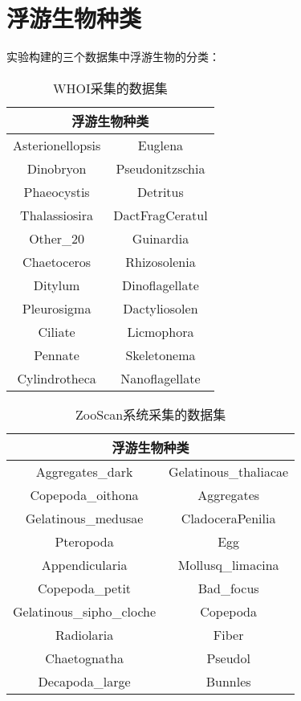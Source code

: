 \chapter{浮游生物种类}
\label{fulu}

实验构建的三个数据集中浮游生物的分类：

\begin{table}[ht]
\small
  \centering
  \caption{WHOI采集的数据集}
  \begin{tabular}[c]{cc}
    \toprule
    \multicolumn{2}{c}{浮游生物种类}\\
    \midrule
    Asterionellopsis & Euglena\\
    Dinobryon & Pseudonitzschia\\
    Phaeocystis & Detritus\\
    Thalassiosira & DactFragCeratul\\
    Other\_20 & Guinardia\\
    Chaetoceros & Rhizosolenia\\
    Ditylum & Dinoflagellate\\
    Pleurosigma & Dactyliosolen\\
    Ciliate & Licmophora\\
    Pennate & Skeletonema\\
    Cylindrotheca & Nanoflagellate\\
    \bottomrule
  \end{tabular}
\end{table}

\begin{table}[ht]
\small
  \centering
  \caption{ZooScan系统采集的数据集}
  \begin{tabular}[c]{cc}
    \toprule
    \multicolumn{2}{c}{浮游生物种类}\\
    \midrule
    Aggregates\_dark & Gelatinous\_thaliacae\\
    Copepoda\_oithona & Aggregates\\
    Gelatinous\_medusae & CladoceraPenilia\\
    Pteropoda & Egg\\
    Appendicularia & Mollusq\_limacina\\
    Copepoda\_petit & Bad\_focus\\
    Gelatinous\_sipho\_cloche & Copepoda\\
    Radiolaria & Fiber\\
    Chaetognatha & Pseudol\\
    Decapoda\_large & Bunnles\\
    \bottomrule
  \end{tabular}
\end{table}

